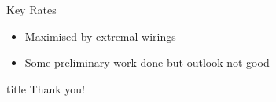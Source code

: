 \documentclass[xcolor=dvipsnames]{beamer}
\newcommand{\?}{\mathrel{?}} %
\begin{document}
\begin{frame}{Key Rates}
  \begin{itemize}[<+->]
    \item Maximised by extremal wirings
    \item Some preliminary work done but outlook not good
  \end{itemize}
\end{frame}

\begin{frame}[c]{}
  \begin{center}
    \begin{beamercolorbox}[sep=8pt,center,shadow=true,rounded=true]{title}
      Thank you!
    \end{beamercolorbox}
  \end{center}
\end{frame}

\end{document}
